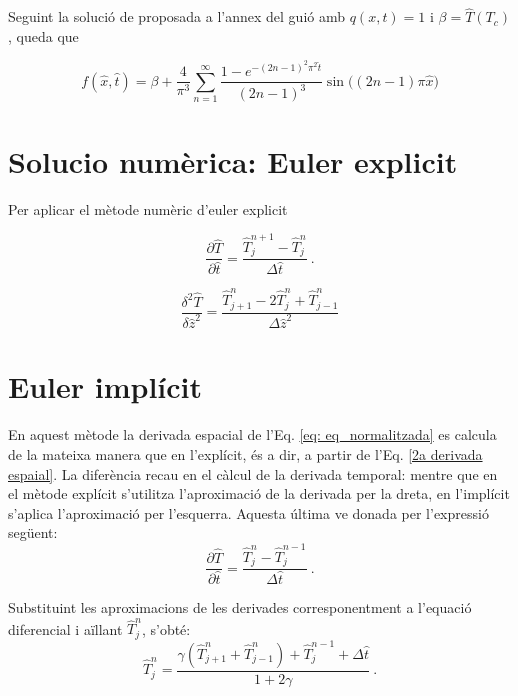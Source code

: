\documentclass[11pt]{article}
\begin{document}
Seguint la solució de proposada a l'annex del guió amb $q(x,t)=1$ i $\beta=\hat{T}(T_c)$, queda que



\begin{equation}
    f(\hat{x}, \hat{t}) = \beta + \frac{4}{\pi^3} \sum_{n=1}^{\infty} \frac{1 - e^{-(2n-1)^2 \pi^2 \hat{t}}}{(2n-1)^3} \sin\big((2n-1)\pi \hat{x})
\label{eq: analitica}
\end{equation}


\section{Solucio numèrica: Euler explicit}

Per aplicar el mètode numèric d'euler explicit

\begin{equation}
    \frac{\partial \hat{T}}{\partial \hat{t}} = \frac{\hat{T}_j^{n+1} - \hat{T}_j^n}{\Delta \hat{t}} \ .
    \label{derivada per la dreta}
\end{equation}

\begin{equation}
    \frac{\delta^2 \hat{T}}{\delta \hat{z}^2} = \frac{\hat{T}_{j+1}^n - 2\hat{T}_{j}^n + \hat{T}_{j-1}^n}{\Delta \hat{z}^2}
    \label{2a derivada espaial}
\end{equation}

\section{Euler implícit}
En aquest mètode la derivada espacial de l'Eq. \eqref{eq: eq_normalitzada} es calcula de la mateixa manera que en l'explícit, és a dir, a partir de l'Eq. \eqref{2a derivada espaial}. La diferència recau en el càlcul de la derivada temporal: mentre que en el mètode explícit s'utilitza l'aproximació de la derivada per la dreta, en l'implícit s'aplica l'aproximació per l'esquerra. Aquesta última ve donada per l'expressió següent:
\begin{equation}
    \frac{\partial \hat{T}}{\partial \hat{t}} = \frac{\hat{T}_j^n - \hat{T}_j^{n-1}}{\Delta \hat{t}} \ .
    \label{derivada per lesquerra}
\end{equation}

Substituint les aproximacions de les derivades corresponentment a l'equació diferencial i aïllant $\hat{T}_j^n$, s'obté:
\begin{equation}
    \hat{T}_j^n = \frac{\gamma \left( \hat{T}_{j+1}^n + \hat{T}_{j-1}^n \right) + \hat{T}_j^{n-1} + \Delta \hat{t}}{1 + 2\gamma}
    \label{Tnj implicit} \ .
\end{equation}
\end{document}
